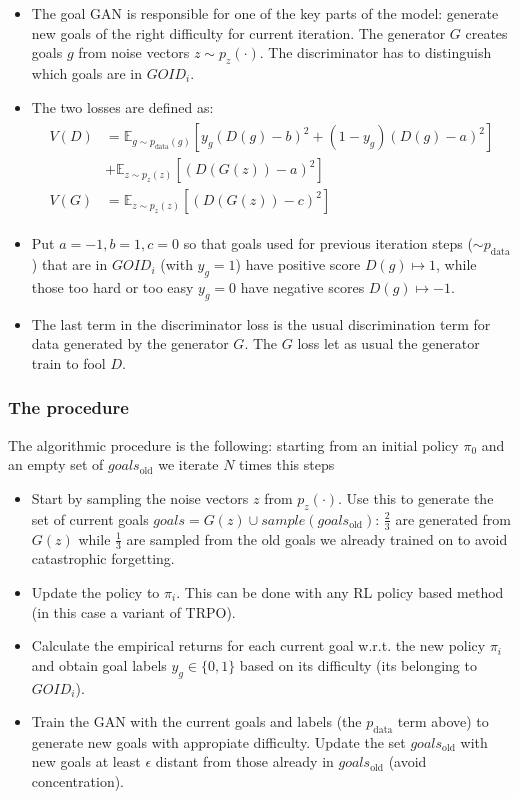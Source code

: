 \documentclass{beamer}
\theoremstyle{plain}
\theoremstyle{definition}
\theoremstyle{remark}
\newcommand{\E}{\mathds{E}}
\newcommand{\gold}{goals_{\text{old}}}
\begin{document}
\begin{frame}
	\begin{itemize}
		\item The goal GAN is responsible for one of the key parts of the model: generate new goals of the right difficulty for current iteration. The generator $G$ creates goals $g$ from noise vectors $z\sim p_z(\cdot)$. The discriminator has to distinguish which goals are in $GOID_i$.
		\item The two losses are defined as:
			\begin{align*}
				\begin{split}
					V(D) & = \E_{g\sim p_{\text{data}}(g)}\left[y_g(D(g)-b)^2+(1-y_g)(D(g)-a)^2\right]\\
								 & +\E_{z\sim p_z(z)}\left[(D(G(z))-a)^2\right]\\
					V(G) & = \E_{z\sim p_{z}(z)}\left[(D(G(z))-c)^2\right]
				\end{split}
			\end{align*}
		\item Put $a=-1, b=1, c=0$ so that goals used for previous iteration steps ($\sim p_{\text{data}}$) that are in $GOID_i$ (with $y_g=1$) have positive score $D(g)\mapsto 1$, while those too hard or too easy $y_g=0$ have negative scores $D(g)\mapsto -1$.
		\item The last term in the discriminator loss is the usual discrimination term for data generated by the generator $G$. The $G$ loss let as usual the generator train to fool $D$.
	\end{itemize}
\end{frame}

\begin{frame}
	\frametitle{The procedure}
	The algorithmic procedure is the following: starting from an initial policy $\pi_0$ and an empty set of $\gold$ we iterate $N$ times this steps
	\begin{itemize}
		\item Start by sampling the noise vectors $z$ from $p_z(\cdot)$. Use this to generate the set of current goals $goals=G(z)\cup sample(\gold)$: $\frac{2}{3}$ are generated from $G(z)$ while $\frac{1}{3}$ are sampled from the old goals we already trained on to avoid catastrophic forgetting.
		\item Update the policy to $\pi_i$. This can be done with any RL policy based method (in this case a variant of TRPO). 
		\item Calculate the empirical returns for each current goal w.r.t. the new policy $\pi_i$ and obtain goal labels $y_g\in \{0,1\}$ based on its difficulty (its belonging to $GOID_i$). 
		\item Train the GAN with the current goals and labels (the $p_{\text{data}}$ term above) to generate new goals with appropiate difficulty. Update the set $\gold$ with new goals at least $\epsilon$ distant from those already in $\gold$ (avoid concentration).
	\end{itemize}
\end{frame}
\end{document}
